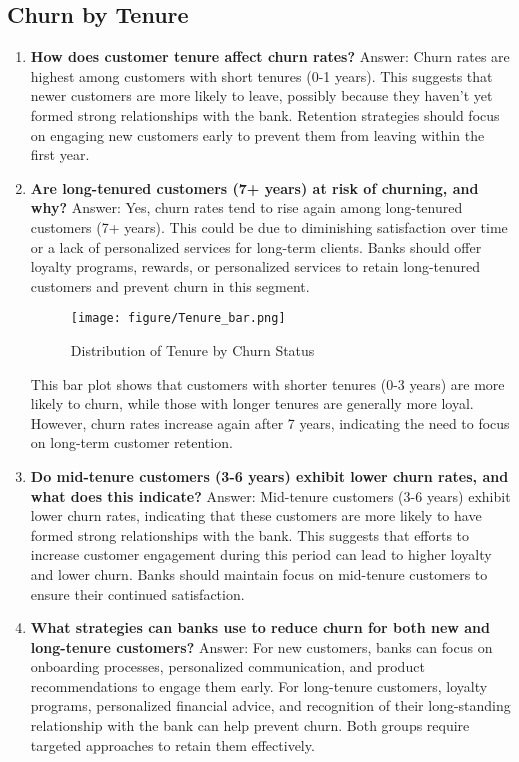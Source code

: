 \documentclass[12pt]{article}
\begin{document}
\subsection{Churn by Tenure}
\begin{enumerate}
    \item \textbf{ How does customer tenure affect churn rates?}
    Answer: Churn rates are highest among customers with short tenures (0-1 years). This suggests that newer customers are more likely to leave, possibly because they haven't yet formed strong relationships with the bank. Retention strategies should focus on engaging new customers early to prevent them from leaving within the first year.

    \item \textbf{Are long-tenured customers (7+ years) at risk of churning, and why?}
    Answer: Yes, churn rates tend to rise again among long-tenured customers (7+ years). This could be due to diminishing satisfaction over time or a lack of personalized services for long-term clients. Banks should offer loyalty programs, rewards, or personalized services to retain long-tenured customers and prevent churn in this segment.
    
   \begin{figure}[h] %
    \centering
    \texttt{[image: figure/Tenure\_bar.png]} %
    \caption{Distribution of Tenure by Churn Status} %
    \label{fig:tenure_distribution} %
\end{figure}


    This bar plot shows that customers with shorter tenures (0-3 years) are more likely to churn, while those with longer tenures are generally more loyal. However, churn rates increase again after 7 years, indicating the need to focus on long-term customer retention.

    \item \textbf{Do mid-tenure customers (3-6 years) exhibit lower churn rates, and what does this indicate?}
    Answer: Mid-tenure customers (3-6 years) exhibit lower churn rates, indicating that these customers are more likely to have formed strong relationships with the bank. This suggests that efforts to increase customer engagement during this period can lead to higher loyalty and lower churn. Banks should maintain focus on mid-tenure customers to ensure their continued satisfaction.
\newpage
    \item \textbf{What strategies can banks use to reduce churn for both new and long-tenure customers?}
    Answer: For new customers, banks can focus on onboarding processes, personalized communication, and product recommendations to engage them early. For long-tenure customers, loyalty programs, personalized financial advice, and recognition of their long-standing relationship with the bank can help prevent churn. Both groups require targeted approaches to retain them effectively.


\end{enumerate}
\end{document}
